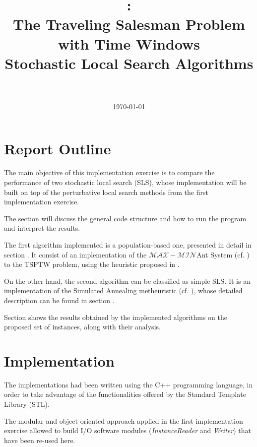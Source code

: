 \documentclass{article}
\title{
\vspace{2in}
\textmd{\textbf{\hmwkClass:\\ The Traveling Salesman Problem with Time Windows \\ Stochastic Local Search Algorithms}}\\
\vspace{0.1in}\large{\textit{\hmwkClassInstructor\ }}
\vspace{3in}
}
\author{\textbf{\hmwkAuthorName}}
\date{\today} %
\newcommand{\maxmin}{$\mathcal{MAX}-\mathcal{MIN}$}
\begin{document}
\maketitle



\newpage
\tableofcontents
\newpage

\section{Report Outline}
The main objective of this implementation exercise is to compare the performance of two stochastic local search (SLS), whose
implementation will be built on top of the perturbative local search methods from the first implementation exercise.

The  section will discuss the general code structure and how to run the program and interpret the results.

The first algorithm implemented is a population-based one, presented in detail in section .
It consist of an implementation of the \maxmin Ant System (cf. \cite{stutzle2000max}) to the TSPTW problem, using the heuristic proposed in \cite{lopez2010beam}. 

On the other hand, the second algorithm can be classified as simple SLS.
It is an implementation of the Simulated Annealing metheuristic (cf. \cite{kirkpatrick1983optimization}), whose detailed description can be found in section .

Section  shows the results obtained by the implemented algorithms on the proposed set of instances, along with their analysis.

\section{Implementation}\label{impl}
The implementations had been written using the C++ programming language, in order to take advantage of the functionalities offered by the Standard Template Library (STL).

The modular and object oriented approach applied in the first implementation exercise allowed to build I/O software modules (\emph{InstanceReader} and \emph{Writer}) that have been re-used here.
\end{document}
